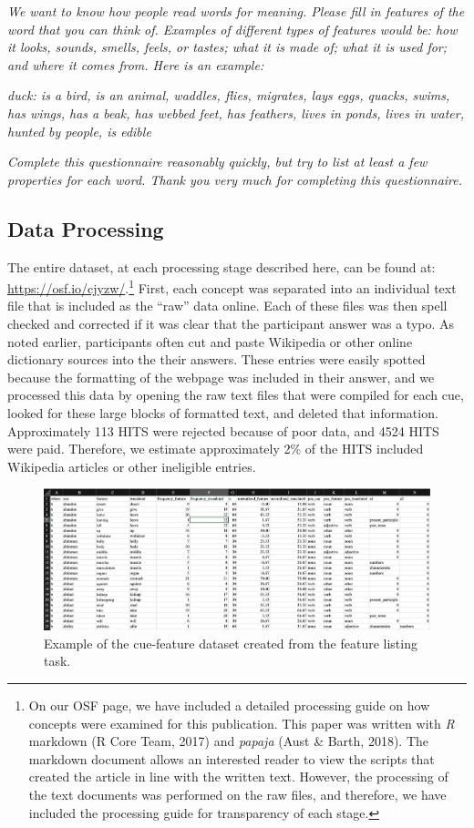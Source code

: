 \documentclass[english,,man]{apa6}
\let\rmarkdownfootnote\footnote%
\def\footnote{\protect\rmarkdownfootnote}
\begin{document}
\emph{We want to know how people read words for meaning. Please fill in features of the word that you can think of. Examples of different types of features would be: how it looks, sounds, smells, feels, or tastes; what it is made of; what it is used for; and where it comes from. Here is an example:}

\emph{duck: is a bird, is an animal, waddles, flies, migrates, lays eggs, quacks, swims, has wings, has a beak, has webbed feet, has feathers, lives in ponds, lives in water, hunted by people, is edible}

\emph{Complete this questionnaire reasonably quickly, but try to list at least a few properties for each word. Thank you very much for completing this questionnaire.}

\hypertarget{data-processing}{%
\subsection{Data Processing}\label{data-processing}}

The entire dataset, at each processing stage described here, can be found at: \url{https://osf.io/cjyzw/}.\footnote{On our OSF page, we have included a detailed processing guide on how concepts were examined for this publication. This paper was written with \emph{R} markdown (R Core Team, 2017) and \emph{papaja} (Aust \& Barth, 2018). The markdown document allows an interested reader to view the scripts that created the article in line with the written text. However, the processing of the text documents was performed on the raw files, and therefore, we have included the processing guide for transparency of each stage.} First, each concept was separated into an individual text file that is included as the \enquote{raw} data online. Each of these files was then spell checked and corrected if it was clear that the participant answer was a typo. As noted earlier, participants often cut and paste Wikipedia or other online dictionary sources into the their answers. These entries were easily spotted because the formatting of the webpage was included in their answer, and we processed this data by opening the raw text files that were compiled for each cue, looked for these large blocks of formatted text, and deleted that information. Approximately 113 HITS were rejected because of poor data, and 4524 HITS were paid. Therefore, we estimate approximately 2\% of the HITS included Wikipedia articles or other ineligible entries.

\begin{figure}
\includegraphics[width=1\linewidth]{featuredataset} \caption{Example of the cue-feature dataset created from the feature listing task.}\label{fig:featuredata}
\end{figure}
\end{document}
